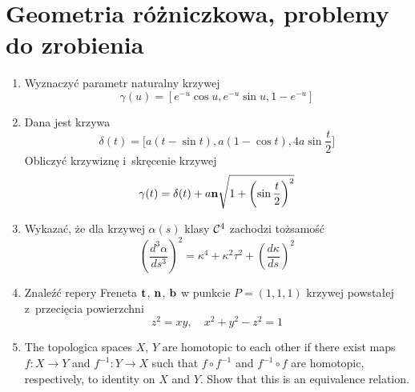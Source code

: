 \documentclass[a4paper,11pt]{article}
\begin{document}
\section{Geometria różniczkowa, problemy do zrobienia}





\begin{enumerate}

\item Wyznaczyć parametr naturalny krzywej
  \begin{equation}
    \label{eq:DiffGeo-01}
    \gamma( u ) = \left[ e^{ -u } \cos u, e^{ -u } \sin u, 1 - e^{ -u } \right]
  \end{equation}

\item Dana jest krzywa
  \begin{equation}
    \label{eq:DiffGeo-02}
    \delta( t ) =
    \big[ a ( t - \sin t ), a ( 1 - \cos t ), 4a \sin \frac{ t }{ 2 } \big]
  \end{equation}
  Obliczyć krzywiznę i~skręcenie krzywej
  \begin{equation}
    \label{eq:DiffGeo-03}
    \gamma( t ) =
    \delta( t )
    + a \mathbf{n} \sqrt{ 1 + \left( \sin \frac{ t }{ 2 } \right)^{ 2 } }
  \end{equation}

\item Wykazać, że dla krzywej $\alpha( s )$ klasy $\mathcal{C}^{ 4 }$ zachodzi
  tożsamość
  \begin{equation}
    \label{eq:DiffGeo-04}
    \left( \frac{ d^{ 3 } \alpha }{ d s^{ 3 } } \right)^{ 2 } =
    \kappa^{ 4 } + \kappa^{ 2 } \tau^{ 2 } + \left( \frac{ d \kappa }{ d s } \right)^{ 2 }
  \end{equation}

\item Znaleźć repery Freneta $\mathbf{t}$, $\mathbf{n}$, $\mathbf{b}$ w
  punkcie $P = (1, 1, 1)$ krzywej powstałej z~przecięcia powierzchni
  \begin{equation}
    \label{eq:DiffGeo-05}
    z^{ 2 } = xy, \quad
    x^{ 2 } + y^{ 2 } - z^{ 2 } = 1
  \end{equation}

\item The topologica spaces $X$, $Y$ are homotopic to each other if
  there exist maps $f : X \to Y$ and $f^{ -1 } : Y \to X$ such that
  $f \circ f^{ -1 }$ and $f^{ -1 } \circ f$ are homotopic,
  respectively, to identity on $X$ and $Y$. Show that this is an
  equivalence relation.


\end{enumerate}
\end{document}
